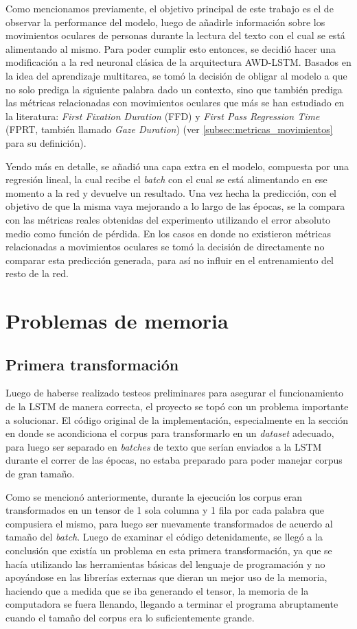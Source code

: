 Como mencionamos previamente, el objetivo principal de este trabajo es el de observar la performance del modelo, luego de añadirle información sobre los movimientos oculares de personas durante la lectura del texto con el cual se está alimentando al mismo. Para poder cumplir esto entonces, se decidió hacer una modificación a la red neuronal clásica de la arquitectura AWD-LSTM. Basados en la idea del aprendizaje multitarea, se tomó la decisión de obligar al modelo a que no solo prediga la siguiente palabra dado un contexto, sino que también prediga las métricas relacionadas con movimientos oculares que más se han estudiado en la literatura: \textit{First Fixation Duration} (FFD) y \textit{First Pass Regression Time} (FPRT, también llamado \textit{Gaze Duration}) (ver \ref{subsec:metricas_movimientos} para su definición).

Yendo más en detalle, se añadió una capa extra en el modelo, compuesta por una regresión lineal, la cual recibe el \textit{batch} con el cual se está alimentando en ese momento a la red y devuelve un resultado. Una vez hecha la predicción, con el objetivo de que la misma vaya mejorando a lo largo de las épocas, se la compara con las métricas reales obtenidas del experimento utilizando el error absoluto medio como función de pérdida. En los casos en donde no existieron métricas relacionadas a movimientos oculares se tomó la decisión de directamente no comparar esta predicción generada, para así no influir en el entrenamiento del resto de la red.

\section{Problemas de memoria}

\subsection{Primera transformación}

Luego de haberse realizado testeos preliminares para asegurar el funcionamiento de la LSTM de manera correcta, el proyecto se topó con un problema importante a solucionar. El código original de la implementación, especialmente en la sección en donde se acondiciona el corpus para transformarlo en un \textit{dataset} adecuado, para luego ser separado en \textit{batches} de texto que serían enviados a la LSTM durante el correr de las épocas, no estaba preparado para poder manejar corpus de gran tamaño. 

Como se mencionó anteriormente, durante la ejecución los corpus eran transformados en un tensor de 1 sola columna y 1 fila por cada palabra que compusiera el mismo, para luego ser nuevamente transformados de acuerdo al tamaño del \textit{batch}. Luego de examinar el código detenidamente, se llegó a la conclusión que existía un problema en esta primera transformación, ya que se hacía utilizando las herramientas básicas del lenguaje de programación y no apoyándose en las librerías externas que dieran un mejor uso de la memoria, haciendo que a medida que se iba generando el tensor, la memoria de la computadora se fuera llenando, llegando a terminar el programa abruptamente cuando el tamaño del corpus era lo suficientemente grande.

